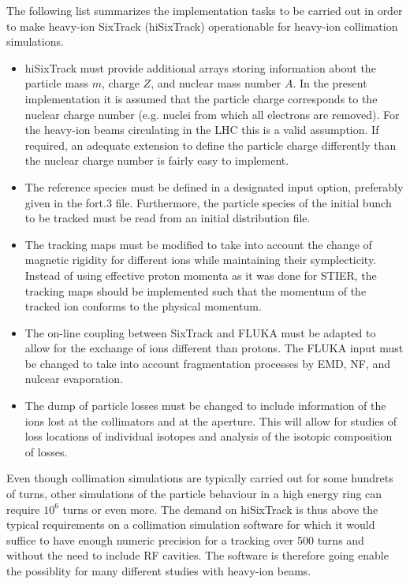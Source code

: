 The following list summarizes the implementation tasks to be carried out in order to make heavy-ion SixTrack (hiSixTrack) operationable for heavy-ion collimation simulations.
%
\begin{itemize}
        \item hiSixTrack must provide additional arrays storing information about the particle mass $m$, charge $Z$, and nuclear mass number $A$. In the present implementation it is assumed that the particle charge corresponds to the nuclear charge number (e.g. nuclei from which all electrons are removed). For the heavy-ion beams circulating in the LHC this is a valid assumption. If required, an adequate extension to define the particle charge differently than the nuclear charge number is fairly easy to implement. 
	\item The reference species must be defined in a designated input option, preferably given in the fort.3 file. Furthermore, the particle species of the initial bunch to be tracked must be read from an initial distribution file.
	\item The tracking maps must be modified to take into account the change of magnetic rigidity for different ions while maintaining their symplecticity. Instead of using effective proton momenta as it was done for STIER, the tracking maps should be implemented such that the momentum of the tracked ion conforms to the physical momentum. 
	\item The on-line coupling between SixTrack and FLUKA must be adapted to allow for the exchange of ions different than protons. The FLUKA input must be changed to take into account fragmentation processes by EMD, NF, and nulcear evaporation. 
	\item The dump of particle losses must be changed to include information of the ions lost at the collimators and at the aperture. This will allow for studies of loss locations of individual isotopes and analysis of the isotopic composition of losses. 

\end{itemize}

Even though collimation simulations are typically carried out for some hundrets of turns, other simulations of the particle behaviour in a high energy ring can require $10^6$ turns or even more. The demand on hiSixTrack is thus above the typical requirements on a collimation simulation software for which it would suffice to have enough numeric precision for a tracking over 500 turns and without the need to include RF cavities. The software is therefore going enable the possiblity for many different studies with heavy-ion beams.

